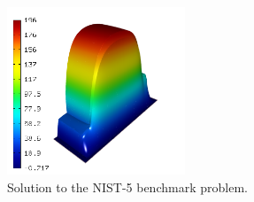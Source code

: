\documentclass[12pt]{elsarticle}
\begin{document}
\begin{figure}[H]
\centering
\vspace{-3mm}
\includegraphics[height=5cm]{nist/nist-5/solution.png}
\vspace{-3mm}
\caption{Solution to the NIST-5 benchmark problem.}
\label{fig:sln-nist05}
\end{figure}

\end{document}

